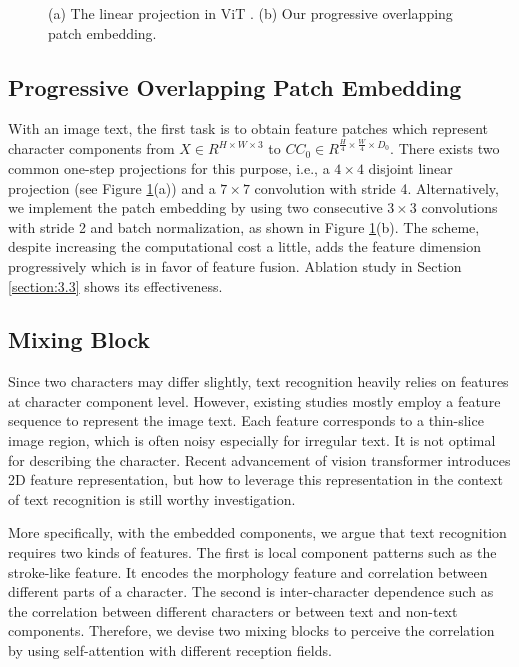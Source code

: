 \documentclass{article}
\begin{document}
\begin{figure}[t]
	\centering  
	\subfigbottomskip=2pt
	\subfigcapskip=-5pt
\caption{(a) The linear projection in ViT \protect\cite{dosovitskiy2020vit}. (b) Our progressive overlapping patch embedding.}
\label{fig:3}
\end{figure}
\subsection{Progressive Overlapping Patch Embedding}
With an image text, the first task is to obtain feature patches which represent character components from $X \in  R^{H \times W \times 3}$ to $CC_{0}  \in R^{ \frac{H}{4} \times \frac{W}{4} \times D_{0} }$. 
There exists two common one-step projections for this purpose, i.e., a $4 \times 4$ disjoint linear projection (see Figure \ref{fig:3}(a)) and a $7 \times 7$ convolution with stride 4.
Alternatively, we implement the patch embedding by using two consecutive $3 \times 3$ convolutions with stride 2 and batch normalization, as shown in Figure \ref{fig:3}(b). The scheme, despite increasing the computational cost a little, adds the feature dimension progressively which is in favor of feature fusion. Ablation study in Section \ref{section:3.3} shows its effectiveness. 




\subsection{Mixing Block}

Since two characters may differ slightly, text recognition heavily relies on features at character component level. However, existing studies mostly employ a feature sequence to represent the image text. Each feature corresponds to a thin-slice image region, which is often noisy especially for irregular text. It is not optimal for describing the character. Recent advancement of vision transformer introduces 2D feature representation, but how to leverage this representation in the context of text recognition is still worthy investigation.

More specifically, with the embedded components, we argue that text recognition requires two kinds of features. The first is local component patterns such as the stroke-like feature. It encodes the morphology feature and correlation between different parts of a character. The second is inter-character dependence such as the correlation between different characters or between text and non-text components. Therefore, we devise two mixing blocks to perceive the correlation by using self-attention with different reception fields.
\end{document}
